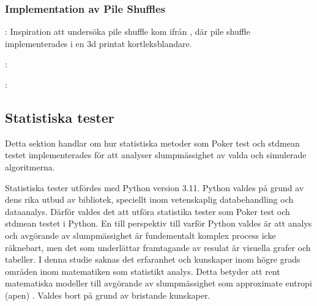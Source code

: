 \documentclass[swedish,a4paper]{article}
\begin{document}
\subsubsection{Implementation av Pile Shuffles}
% 

: Inspiration att undersöka pile shuffle kom ifrån
\textcite{3DprintedLife2021},
där pile shuffle implementerades i en 3d printat kortleksblandare.  

: 


: 

\subsection{Statistiska tester}
Detta sektion handlar om hur statistiska metoder som Poker test och 
\gls{stdmean} testet implementerades för att analyser slumpmässighet av valda
och simulerade algoritmerna.

Statistiska tester utfördes med Python version 3.11. Python valdes på
grund av dens rika utbud av bibliotek, speciellt inom
veten\-skaplig data\-behandling och data\-analys. Därför valdes det
att utföra statistika tester som Poker test och \gls{stdmean} testet i Python.
En till perspektiv till varför Python valdes är att analys och avgörande
av slump\-mässighet är fundementalt komplex process icke räknebart, men det som
underlättar framtagande av resulat är visuella grafer och tabeller. I
denna studie saknas det erfaranhet och kunskaper inom högre grads
områden inom matematiken som statistikt analys. Detta betyder att rent
matematiska modeller till avgörande av slumpmässighet som approximate
entropi (\gls{apen})  \parencite{ApEn}. Valdes bort på grund av bristande
kunskaper.


\end{document}
